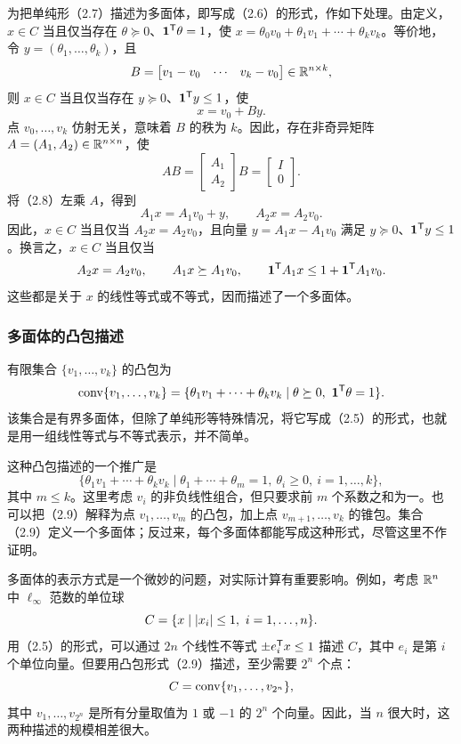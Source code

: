 为把单纯形（2.7）描述为多面体，即写成（2.6）的形式，作如下处理。由定义，$x\in C$ 当且仅当存在 $\theta\succeq0$、$\mathbf 1^{\mathsf T}\theta=1$，使 $x=\theta_0v_0+\theta_1v_1+\cdots+\theta_kv_k$。等价地，令 $y=(\theta_1,\ldots,\theta_k)$，且
\[
 B=\begin{bmatrix}v_1-v_0&\cdots&v_k-v_0\end{bmatrix}\in\mathbb R^{n\times k},
\]
则 $x\in C$ 当且仅当存在 $y\succeq0$、$\mathbf 1^{\mathsf T}y\le1$，使
\begin{equation}
 x=v_0+By.\tag{2.8}
\end{equation}
点 $v_0,\ldots,v_k$ 仿射无关，意味着 $B$ 的秩为 $k$。因此，存在非奇异矩阵 $A=(A_1,A_2)\in\mathbb R^{n\times n}$，使
\[
 AB=\begin{bmatrix}A_1\\A_2\end{bmatrix}B
 =\begin{bmatrix}I\\0\end{bmatrix}.
\]
将（2.8）左乘 $A$，得到
\[
 A_1x=A_1v_0+y,\qquad A_2x=A_2v_0.
\]
因此，$x\in C$ 当且仅当 $A_2x=A_2v_0$，且向量 $y=A_1x-A_1v_0$ 满足 $y\succeq0$、$\mathbf 1^{\mathsf T}y\le1$。换言之，$x\in C$ 当且仅当
\[
 A_2x=A_2v_0,\qquad A_1x\succeq A_1v_0,\qquad
 \mathbf 1^{\mathsf T}A_1x\le1+\mathbf 1^{\mathsf T}A_1v_0.
\]
这些都是关于 $x$ 的线性等式或不等式，因而描述了一个多面体。

\subsubsection*{多面体的凸包描述}
有限集合 $\{v_1,\ldots,v_k\}$ 的凸包为
\[
 \conv\{v_1,\ldots,v_k\}
 =\{\theta_1v_1+\cdots+\theta_kv_k\mid\theta\succeq0,\ \one^{\T}\theta=1\}.
\]
该集合是有界多面体，但除了单纯形等特殊情况，将它写成（2.5）的形式，也就是用一组线性等式与不等式表示，并不简单。

这种凸包描述的一个推广是
\begin{equation}
 \{\theta_1v_1+\cdots+\theta_kv_k\mid
 \theta_1+\cdots+\theta_m=1,\ \theta_i\ge0,\ i=1,\ldots,k\},\tag{2.9}
\end{equation}
其中 $m\le k$。这里考虑 $v_i$ 的非负线性组合，但只要求前 $m$ 个系数之和为一。也可以把（2.9）解释为点 $v_1,\ldots,v_m$ 的凸包，加上点 $v_{m+1},\ldots,v_k$ 的锥包。集合（2.9）定义一个多面体；反过来，每个多面体都能写成这种形式，尽管这里不作证明。

多面体的表示方式是一个微妙的问题，对实际计算有重要影响。例如，考虑 $\mathbb R^n$ 中 $\ell_\infty$ 范数的单位球
\[
 C=\{x\mid\abs{x_i}\le1,\ i=1,\ldots,n\}.
\]
用（2.5）的形式，可以通过 $2n$ 个线性不等式 $\pm e_i^{\mathsf T}x\le1$ 描述 $C$，其中 $e_i$ 是第 $i$ 个单位向量。但要用凸包形式（2.9）描述，至少需要 $2^n$ 个点：
\[
 C=\operatorname{conv}\{v_1,\ldots,v_{2^n}\},
\]
其中 $v_1,\ldots,v_{2^n}$ 是所有分量取值为 $1$ 或 $-1$ 的 $2^n$ 个向量。因此，当 $n$ 很大时，这两种描述的规模相差很大。

